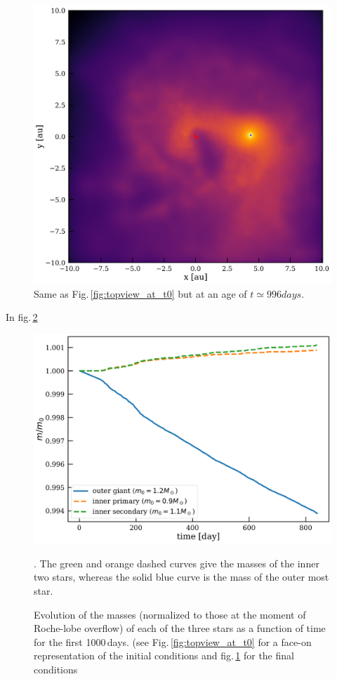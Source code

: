 \documentclass{aastex62}
\begin{document}
\begin{figure}[ht!]
  \includegraphics[width=\columnwidth]{fig_t600_N80000_M012MSun1109MSun_a02au_e00_inc9deg.pdf}
\caption{Same as Fig.\,\ref{fig:topview_at_t0} but at an age of $t
  \simeq 996days$.
\label{fig:topview_at_t1000day}}
\end{figure}

In fig.\,\ref{fig:mass_evolution_for_M1.2M1.1M0.9a02e00i09}

\begin{figure}[ht!]
  \includegraphics[width=\columnwidth]{fig_MvsTime_N80k_M012R100RSun1109MSun_a02au.pdf}
\caption{Evolution of the masses (normalized to those at the moment of
  Roche-lobe overflow) of each of the three stars as a function of
  time for the first 1000\,days. (see Fig.\,\ref{fig:topview_at_t0}
  for a face-on representation of the initial conditions and
  fig.\,\ref{fig:topview_at_t1000day} for the final conditions}.  The
green and orange dashed curves give the masses of the inner two stars,
whereas the solid blue curve is the mass of the outer most star.
\label{fig:mass_evolution_for_M1.2M1.1M0.9a02e00i09}
\end{figure}
\end{document}
